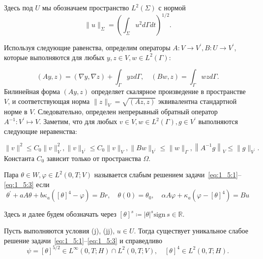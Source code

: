 Здесь под $U$ мы обозначаем пространство $L^{2}(\Sigma)$ с нормой
\[
    \|u\|_{\Sigma}=\left(\int_{\Sigma} u^{2} d \Gamma d t\right)^{1/2}.
\]

Используя следующие равенства, определим операторы $A: V \rightarrow V^{\prime}, B: U \rightarrow V^{\prime}$,
которые выполняются для любых $y, z \in V, w \in L^{2}(\Gamma)$:

\[
    (A y, z)=(\nabla y, \nabla z)+\int_{\Gamma} y z d \Gamma, \quad(B w, z)=\int_{\Gamma} w z d \Gamma.
\]
Билинейная форма $(A y, z)$ определяет скалярное произведение в пространстве $V$,
и соответствующая норма $\|z\|_{V}=\sqrt{(A z, z)}$ эквивалентна стандартной норме в $V$.
Следовательно, определен непрерывный обратный оператор
$A^{-1}: V^{\prime} \mapsto V$.
Заметим, что для любых $v \in V, w \in L^{2}(\Gamma), g \in V^{\prime}$
выполняются следующие неравенства:

\[
    \|v\|^{2} \leq C_{0}\|v\|_{V}^{2},\|v\|_{V^{\prime}} \leq C_{0}\|v\|_{V},
    \|B w\|_{V^{\prime}} \leq\|w\|_{\Gamma},\left\|A^{-1} g\right\|_{V} \leq\|g\|_{V^{\prime}}.
\]
Константа $C_0$ зависит только от пространства $\Omega$.

\begin{definition}
    Пара $\theta \in W, \varphi \in L^{2}(0, T ; V)$
    называется слабым решением задачи~\eqref{eq:1_5:1}--\eqref{eq:1_5:3}
    если
    \begin{equation}
        \label{eq:1_5:weak}
        \theta^{\prime}+a A \theta+b \kappa_{a}\left([\theta]^{4}-\varphi\right)=B r,
        \quad \theta(0)=\theta_{0}, \quad \alpha A \varphi+\kappa_{a}\left(\varphi-[\theta]^{4}\right)=B u
    \end{equation}
\end{definition}
Здесь и далее будем обозначать через
$[\theta]^s \coloneqq |\theta|^s \mathrm{sign}\,s  \in \mathbb{R}$.
\begin{lemma}
    \label{lm:1_5:1}
    Пусть выполняются условия (j), (jj), $u \in U$.
    Тогда существует уникальное слабое решение задачи~\eqref{eq:1_5:1}--\eqref{eq:1_5:3} и справедливо
    \[
        \psi=[\theta]^{5 / 2} \in L^{\infty}(0, T ; H) \cap L^{2}(0, T ; V),
        \quad[\theta]^{4} \in L^{2}(0, T ; H).
    \]
\end{lemma}

